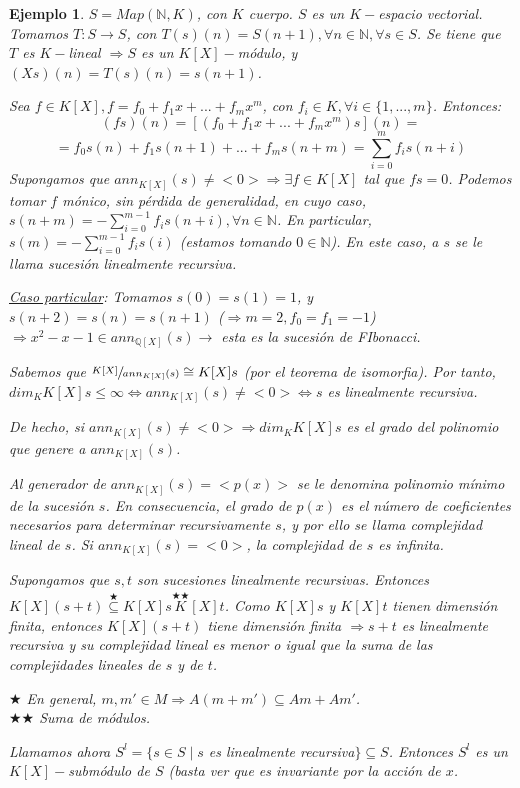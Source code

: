 \documentclass[11pt,a4paper]{article}
\theoremstyle{break}
\newtheorem{example}[theorem]{Ejemplo}
\begin{document}
\begin{example}
$S = Map(\mathbb{N}, K)$, con $K$ cuerpo. $S$ es un $K-$espacio vectorial. Tomamos $T:S \to S$, con $T(s)(n) = S(n+1), \forall n \in \mathbb{N}, \forall s \in S$. Se tiene que $T$ es $K-$lineal $\Rightarrow S$ es un $K[X]-$módulo, y $(Xs)(n) = T(s)(n) = s(n+1)$.

Sea $f \in K[X], f = f_{0} + f_{1} x + ... + f_{m} x^{m}$, con $f_{i} \in K, \forall i \in \{1, ..., m\}$. Entonces:
$$(fs)(n) = [(f_{0} + f_{1}x + ... + f_{m}x^{m})s](n) =$$
$$= f_{0}s(n) + f_{1}s(n+1) + ... + f_{m}s(n+m) = \sum_{i=0}^{m} f_{i}s(n+i)$$
Supongamos que $ann_{K[X]}(s) \neq <0> \Rightarrow \exists f \in K[X]$ tal que $fs = 0$. Podemos tomar $f$ mónico, sin pérdida de generalidad, en cuyo caso, $s(n+m) = - \sum_{i=0}^{m-1} f_{i} s(n+i), \forall n \in \mathbb{N}$. En particular, $s(m) = -\sum_{i=0}^{m-1} f_{i}s(i)$ (estamos tomando $0 \in \mathbb{N}$). En este caso, a $s$ se le llama sucesión linealmente recursiva.

\underline{Caso particular}: Tomamos $s(0) = s(1) = 1$, y $s(n+2) = s(n) = s(n+1)$ ($\Rightarrow m=2, f_{0} = f_{1} = -1$) $\Rightarrow x^{2} - x - 1 \in ann_{\mathbb{Q}[X]}(s) \rightarrow$ esta es la sucesión de FIbonacci.

Sabemos que $\sfrac{K[X]}{ann_{K[X]}(s)} \cong K[X]s$ (por el teorema de isomorfia). Por tanto, $dim_{K}K[X]s \leq \infty \iff ann_{K[X]}(s) \neq <0> \iff s$ es linealmente recursiva.

De hecho, si $ann_{K[X]}(s) \neq <0> \Rightarrow dim_{K} K[X]s$ es el grado del polinomio que genere a $ann_{K[X]}(s)$.

Al generador de $ann_{K[X]}(s) = <p(x)>$ se le denomina polinomio mínimo de la sucesión $s$. En consecuencia, el grado de $p(x)$ es el número de coeficientes necesarios para determinar recursivamente $s$, y por ello se llama complejidad lineal de $s$. Si $ann_{K[X]}(s) = <0>$, la complejidad de $s$ es infinita.

Supongamos que $s, t$ son sucesiones linealmente recursivas. Entonces \\ $K[X](s+t) \overset{\bigstar}{\subseteq} K[X]s \overset{\bigstar \bigstar} K[X]t$. Como $K[X]s$ y $K[X]t$ tienen dimensión finita, entonces $K[X](s+t)$ tiene dimensión finita $\Rightarrow s + t$ es linealmente recursiva y su complejidad lineal es menor o igual que la suma de las complejidades lineales de $s$ y de $t$.

$\bigstar$ En general, $m, m' \in M \Rightarrow A(m + m') \subseteq Am + Am'$. \\
$\bigstar \bigstar$ Suma de módulos.

Llamamos ahora $S^{l} = \{s \in S \mid s$ es linealmente recursiva$\} \subseteq S$. Entonces $S^{l}$ es un $K[X]-$submódulo de $S$ (basta ver que es invariante por la acción de $x$.
\end{example}
\end{document}
